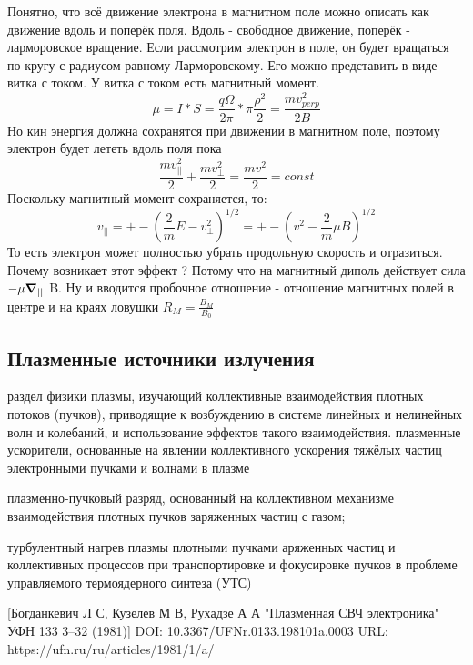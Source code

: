 \documentclass[10pt, a4paper]{article}
\begin{document}
Понятно, что всё движение электрона в магнитном поле можно описать как движение вдоль и поперёк поля. Вдоль - свободное движение, поперёк - ларморовское вращение.
Если рассмотрим электрон в поле, он будет вращаться по кругу с радиусом равному Ларморовскому. Его можно представить в виде витка с током. У витка с током есть магнитный момент.
\begin{equation}
 \mu=I*S=\frac{q\Omega}{2\pi} * \pi \frac{\rho^{2}}{2}=\frac{mv_{perp}^{2}}{2B}
\end{equation}	
Но кин энергия должна сохранятся при движении в магнитном поле, поэтому электрон будет лететь вдоль поля пока
\begin{equation}
	\frac{mv_{||}^{2}}{2}+\frac{mv_{\perp}^{2}}{2}=\frac{mv^{2}}{2}=const
\end{equation}	
Поскольку магнитный момент сохраняется, то:
\begin{equation}
 v_{||}=+-(\frac{2}{m}E-v_{\perp}^{2})^{1/2}=+-(v^{2}-\frac{2}{m} \mu B)^{1/2}
\end{equation}	
То есть электрон может полностью убрать продольную скорость и отразиться. Почему возникает этот эффект ? Потому что на магнитный диполь действует сила $-\mu \grad_{||}$ B. Ну и вводится пробочное отношение - отношение магнитных полей в центре и на краях ловушки $R_M=\frac{B_M}{B_0}$


\subsection{Плазменные источники излучения}

раздел физики плазмы, изучающий коллективные взаимодействия плотных потоков (пучков), приводящие к возбуждению в системе линейных и нелинейных волн и колебаний, и использование эффектов такого взаимодействия.
плазменные ускорители, основанные на явлении коллективного ускорения тяжёлых частиц электронными пучками и волнами в плазме

плазменно-пучковый разряд, основанный на коллективном механизме взаимодействия плотных пучков заряженных частиц с газом;

турбулентный нагрев плазмы плотными пучками аряженных частиц и коллективных процессов при транспортировке и фокусировке пучков в проблеме управляемого термоядерного синтеза (УТС)

[Богданкевич Л С, Кузелев М В, Рухадзе А А "Плазменная СВЧ электроника" УФН 133 3–32 (1981)]
DOI: 10.3367/UFNr.0133.198101a.0003
URL: https://ufn.ru/ru/articles/1981/1/a/
\end{document}
